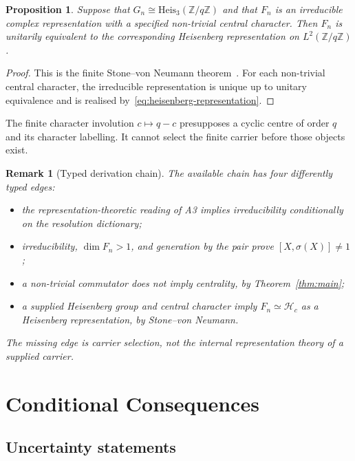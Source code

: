 \documentclass[11pt,a4paper]{article}
\newtheorem{proposition}[theorem]{Proposition}
\newtheorem{remark}[theorem]{Remark}
\newcommand{\Heis}{\mathrm{Heis}_3}
\begin{document}
    \begin{proposition}
      \label{prop:vrho}
      Suppose that $G_n\cong\Heis(\mathbb{Z}/q\mathbb{Z})$ and that $F_n$ is an
      irreducible complex representation with a specified non-trivial central
      character.
      Then $F_n$ is unitarily equivalent to the corresponding Heisenberg
      representation on $L^2(\mathbb{Z}/q\mathbb{Z})$.
    \end{proposition}

    \begin{proof}
      This is the finite Stone--von Neumann theorem~\cite{GurevichHadani2009}.
      For each non-trivial central character, the irreducible representation is
      unique up to unitary equivalence and is realised
      by~\eqref{eq:heisenberg-representation}.
    \end{proof}

    The finite character involution $c\mapsto q-c$ presupposes a cyclic centre of
    order $q$ and its character labelling.
    It cannot select the finite carrier before those objects exist.

    \begin{remark}[Typed derivation chain]
      \label{rem:chain}
      The available chain has four differently typed edges:
      \begin{itemize}
        \item the representation-theoretic reading of A3 implies irreducibility
        conditionally on the resolution dictionary;
        \item irreducibility, $\dim F_n>1$, and generation by the pair prove
        $[X,\sigma(X)]\neq 1$;
        \item a non-trivial commutator does not imply centrality, by
        Theorem~\ref{thm:main};
        \item a supplied Heisenberg group and central character imply
        $F_n\simeq\mathcal{H}_c$ as a Heisenberg representation, by
        Stone--von Neumann.
      \end{itemize}
      The missing edge is carrier selection, not the internal representation
      theory of a supplied carrier.
    \end{remark}

  \clearpage
  \section{Conditional Consequences}
  \label{sec:corollaries}

  \subsection{Uncertainty statements}
\end{document}
